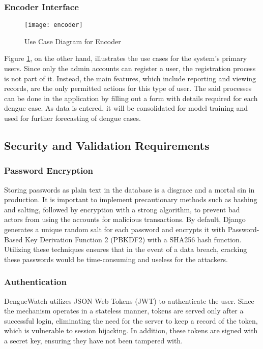 \subsubsection{Encoder Interface}
\begin{figure}[H]
	\centering
	\texttt{[image: encoder]}
	\caption{Use Case Diagram for Encoder}
	\label{fig:encoder-use-case}
\end{figure}

Figure \ref{fig:encoder-use-case}, on the other hand, illustrates the use cases for the system's primary users. Since only the admin accounts can register a user, the registration process is not part of it. Instead, the main features, which include reporting and viewing records, are the only permitted actions for this type of user. The said processes can be done in the application by filling out a form with details required for each dengue case. 
As data is entered, it will be consolidated for model training and used for further forecasting of dengue cases.


\subsection{Security and Validation Requirements}
\subsubsection{Password Encryption}
Storing passwords as plain text in the database is a disgrace and a mortal sin in production. It is important to implement precautionary methods such as hashing and salting, followed by encryption with a strong algorithm, to prevent bad actors from using the accounts for malicious transactions. By default, Django generates a unique random salt for each password and encrypts it with Password-Based Key Derivation Function 2 (PBKDF2) with a SHA256 hash function. Utilizing these techniques ensures that in the event of a data breach, cracking these passwords would be time-consuming and useless for the attackers. 

\subsubsection{Authentication}
DengueWatch utilizes JSON Web Tokens (JWT) to authenticate the user. Since the mechanism operates in a stateless manner, tokens are served only after a successful login, eliminating the need for the server to keep a record of the token, which is vulnerable to session hijacking. In addition, these tokens are signed with a secret key, ensuring they have not been tampered with. 

